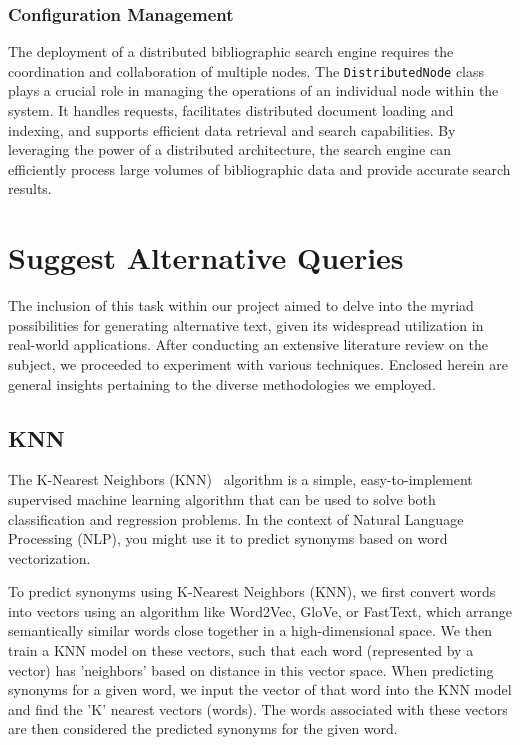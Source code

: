 \documentclass{article}
\begin{document}
\subsubsection*{Configuration Management}


The deployment of a distributed bibliographic search engine requires the coordination and 
collaboration of multiple nodes. The \texttt{DistributedNode} class plays a crucial role in 
managing the operations of an individual node within the system. It handles requests, 
facilitates distributed document loading and indexing, and supports efficient data retrieval and 
search capabilities. By leveraging the power of a distributed architecture, the search engine 
can efficiently process large volumes of bibliographic data and provide accurate search results.

\section{Suggest Alternative Queries}

The inclusion of this task within our project aimed to delve into the myriad possibilities 
for generating alternative text, given its widespread utilization in real-world applications. 
After conducting an extensive literature review on the subject, we proceeded to experiment 
with various techniques. Enclosed herein are general insights pertaining to the diverse 
methodologies we employed.

\subsection{KNN}

The K-Nearest Neighbors (KNN)~\cite{ZQXT20} algorithm is a simple, easy-to-implement 
supervised machine learning algorithm that can be used to solve both classification and 
regression problems. In the context of Natural Language Processing (NLP), you might use it to 
predict synonyms based on word vectorization.

To predict synonyms using K-Nearest Neighbors (KNN), we first convert words into vectors 
using an algorithm like Word2Vec, GloVe, or FastText, which arrange semantically similar 
words close together in a high-dimensional space. We then train a KNN model on these vectors, 
such that each word (represented by a vector) has 'neighbors' based on distance in this 
vector space. When predicting synonyms for a given word, we input the vector of that word 
into the KNN model and find the 'K' nearest vectors (words). The words associated with these 
vectors are then considered the predicted synonyms for the given word.
\end{document}

